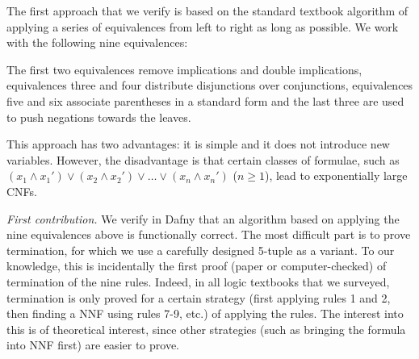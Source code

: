 \documentclass[12pt]{report}
\begin{document}
The first approach that we verify is based on the standard textbook
algorithm of applying a series of equivalences from left to right as
long as possible. We work with the following nine equivalences:
%
\def \MathparLineskip {\lineskip=0.45cm}

The first two equivalences remove implications and double
implications, equivalences three and four distribute disjunctions over
conjunctions, equivalences five and six associate parentheses in a
standard form and the last three are used to push negations towards
the leaves.

This approach has two advantages: it is simple and it does not
introduce new variables. However, the disadvantage is that certain
classes of formulae, such as
$ (x_1 \land x_1') \lor (x_2 \land x_2') \lor \ldots \lor (x_n \land
x_n')$ (\(n \geq 1 \)), lead to exponentially large CNFs.

\emph{First contribution.} We verify in Dafny that an algorithm based
on applying the nine equivalences above is functionally correct. The
most difficult part is to prove termination, for which we use a
carefully designed 5-tuple as a variant. To our knowledge, this is
incidentally the first proof (paper or computer-checked) of
termination of the nine rules. Indeed, in all logic textbooks that we
surveyed, termination is only proved for a certain strategy (first
applying rules 1 and 2, then finding a NNF using rules 7-9, etc.) of
applying the rules. The interest into this is of theoretical interest,
since other strategies (such as bringing the formula into NNF first)
are easier to prove.
\end{document}
